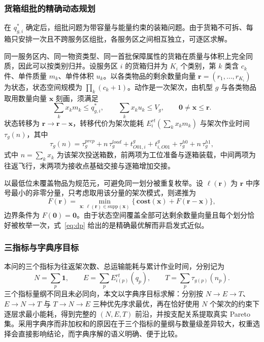 \documentclass[bwprint]{gmcmthesis}
\begin{document}
\subsubsection{货箱组批的精确动态规划}
在 $q^{*}_{g,i}$ 确定后，组批问题为带容量与能量约束的装箱问题。由于货箱不可拆、每箱只安排一次且不跨服务区组批，各服务区之间相互独立，可逐区求解。

同一服务区内、同一物资类型、同一首批保障属性的货箱在质量与体积上完全同质，因此可以按类别归并。设服务区 $i$ 的货箱归并为 $K_i$ 个类别，第 $k$ 类含 $c_k$ 件、单件质量 $m_k$、单件体积 $u_k$。以各类物品的剩余数量向量 $\mathbf{r}=(r_1,\dots,r_{K_i})$ 为状态，状态空间规模为 $\prod_k(c_k+1)$。动作是一次架次，由机型 $g$ 与各类物品取用数量向量 $\mathbf{x}$ 刻画，须满足
\begin{equation}
\sum_{k} x_k m_k\le q^{*}_{g,i},\qquad \sum_{k} x_k u_k\le V_g,\qquad \mathbf{0}\ne\mathbf{x}\le\mathbf{r}.
\label{eq:batchcons}
\end{equation}
状态转移为 $\mathbf{r}\to\mathbf{r}-\mathbf{x}$，转移代价为架次能耗 $E_{i}^{rt}\!\left(\sum_k x_k m_k\right)$ 与架次作业时间 $\tau_g(n)$，其中
\begin{equation}
\tau_g(n)=\tau_g^{prep}+n\,\tau_g^{load}+t_{O01,i}^{g}+t_{i,O01}^{g}+\tau_g^{h0}+n\,\tau_g^{h1},
\label{eq:sortietime}
\end{equation}
式中 $n=\sum_k x_k$ 为该架次投送箱数，前两项为工位准备与逐箱装载，中间两项为往返飞行，末两项为接收点基础交接与逐箱增加交接。

以最低位未覆盖物品为规范元，可避免同一划分被重复枚举。设 $\ell(\mathbf{r})$ 为 $\mathbf{r}$ 中序号最小的非零分量，只考虑取用该分量的架次模式，则递推为
\begin{equation}
F(\mathbf{r})=\min_{\mathbf{x}:\,\ell(\mathbf{r})\in\mathrm{supp}(\mathbf{x})}\Big\{\,\mathbf{cost}(\mathbf{x})+F(\mathbf{r}-\mathbf{x})\Big\},
\label{eq:dp}
\end{equation}
边界条件为 $F(\mathbf{0})=\mathbf{0}$。由于状态空间覆盖全部可达剩余数量向量且每个划分恰好被枚举一次，式~\eqref{eq:dp} 给出的是精确最优解而非启发式近似。

\subsubsection{三指标与字典序目标}
本问的三个指标为往返架次数、总运输能耗与累计作业时间，分别记为
\begin{equation}
N=\sum_{p}\mathbf{1},\qquad E=\sum_{p}E_{i(p)}^{rt}\!\left(q_p\right),\qquad T=\sum_{p}\tau_{g(p)}\!\left(n_p\right).
\label{eq:threeobj}
\end{equation}
三个指标量纲不同且未必同向，本文以字典序目标求解：分别按 $N\to E\to T$、$E\to N\to T$ 与 $T\to N\to E$ 三种优先序求最优，再在恰好使用 $N$ 个架次的约束下逐层求最小能耗，得到完整的 $(N,E,T)$ 前沿，并按支配关系提取真实 Pareto 集。采用字典序而非加权和的原因在于三个指标的量纲与数量级差异较大，权重选择会直接影响结论，而字典序解的语义明确、便于比较。
\end{document}
